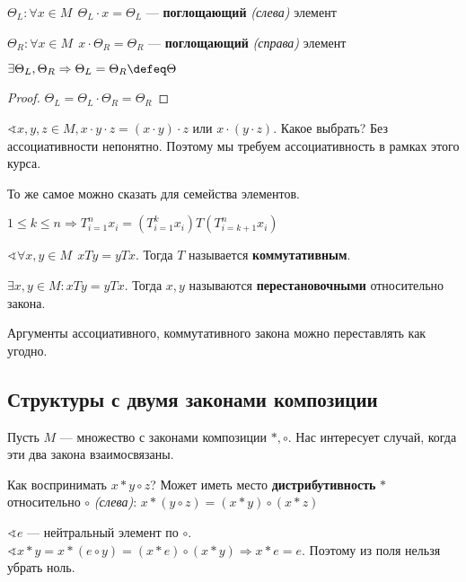 \begin{definition}
    \(\Theta_L : \forall x \in M \ \ \Theta_L \cdot x = \Theta_L\) --- \textbf{поглощающий} \textit{(слева)} элемент

    \(\Theta_R : \forall x \in M \ \ x \cdot \Theta_R = \Theta_R\) --- \textbf{поглощающий} \textit{(справа)} элемент
\end{definition}

\begin{lemma}
    \(\exists \Theta_L, \Theta_R \Rightarrow \Theta_L = \Theta_R \defeq \Theta\)
\end{lemma}
\begin{proof}
    \(\Theta_L = \Theta_L \cdot \Theta_R = \Theta_R\)
\end{proof}

\(\sphericalangle x,y,z \in M, x \cdot y \cdot z = (x \cdot y) \cdot z\) или \(x \cdot (y \cdot z)\). Какое выбрать? Без ассоциативности непонятно. Поэтому мы требуем ассоциативность в рамках этого курса.

То же самое можно сказать для семейства элементов.

\begin{theorem}
    \(1 \leq k \leq n \Rightarrow T_{i = 1}^n x_i = \left( T_{i = 1}^k x_i \right) T \left( T_{i = k + 1}^n x_i \right)\)
\end{theorem}

\begin{definition}
    \(\sphericalangle \forall x, y \in M \ \ xTy = yTx\). Тогда \(T\) называется \textbf{коммутативным}.
\end{definition}

\begin{definition}
    \(\exists x, y \in M : xTy = yTx\). Тогда \(x, y\) называются \textbf{перестановочными} относительно закона.
\end{definition}

\begin{theorem}
    Аргументы ассоциативного, коммутативного закона можно переставлять как угодно.
\end{theorem}

\subsection{Структуры с двумя законами композиции}

Пусть \(M\) --- множество с законами композиции \(*, \circ\). Нас интересует случай, когда эти два закона взаимосвязаны.

Как воспринимать \(x * y \circ z\)? Может иметь место \textbf{дистрибутивность} \(*\) относительно \(\circ\) \textit{(слева)}: \(x * (y \circ z) = (x * y) \circ (x * z)\)

\(\sphericalangle e\) --- нейтральный элемент по \(\circ\). \(\sphericalangle x * y = x * (e \circ y) = (x * e) \circ (x * y) \Rightarrow x * e = e\). Поэтому из поля нельзя убрать ноль.
